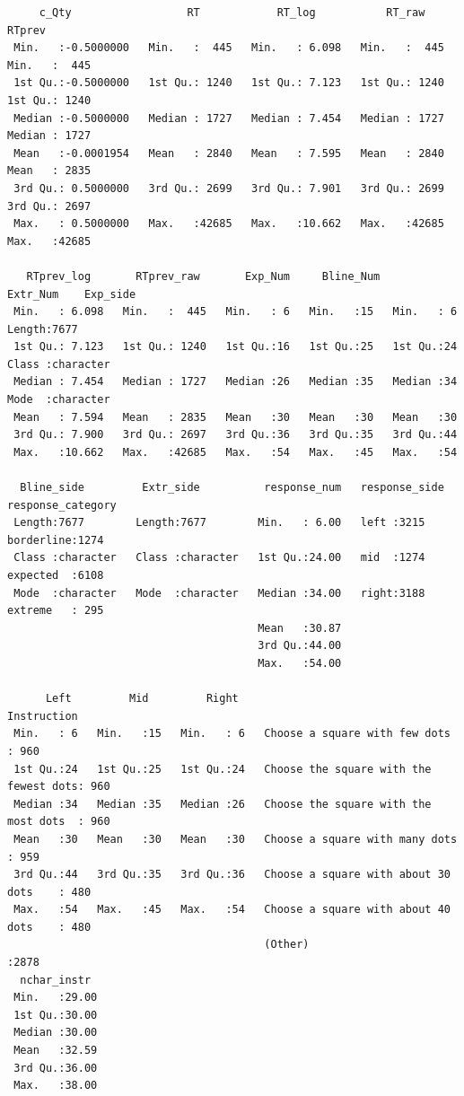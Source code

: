 \documentclass[a4paper,12pt,twoside]{article}\usepackage[]{graphicx}\usepackage[]{color}
\makeatletter
\newenvironment{kframe}{%
 \def\at@end@of@kframe{}%
 \ifinner\ifhmode%
  \def\at@end@of@kframe{\end{minipage}}%
  \begin{minipage}{\columnwidth}%
 \fi\fi%
 \def\FrameCommand##1{\hskip\@totalleftmargin \hskip-\fboxsep
 \colorbox{shadecolor}{##1}\hskip-\fboxsep
     \hskip-\linewidth \hskip-\@totalleftmargin \hskip\columnwidth}%
 \MakeFramed {\advance\hsize-\width
   \@totalleftmargin\z@ \linewidth\hsize
   \@setminipage}}%
 {\par\unskip\endMakeFramed%
 \at@end@of@kframe}
\newenvironment{knitrout}{}{} %
\makeatother
\begin{document}
\begin{knitrout}
\begin{kframe}
\begin{verbatim}
     c_Qty                  RT            RT_log           RT_raw          RTprev     
 Min.   :-0.5000000   Min.   :  445   Min.   : 6.098   Min.   :  445   Min.   :  445  
 1st Qu.:-0.5000000   1st Qu.: 1240   1st Qu.: 7.123   1st Qu.: 1240   1st Qu.: 1240  
 Median :-0.5000000   Median : 1727   Median : 7.454   Median : 1727   Median : 1727  
 Mean   :-0.0001954   Mean   : 2840   Mean   : 7.595   Mean   : 2840   Mean   : 2835  
 3rd Qu.: 0.5000000   3rd Qu.: 2699   3rd Qu.: 7.901   3rd Qu.: 2699   3rd Qu.: 2697  
 Max.   : 0.5000000   Max.   :42685   Max.   :10.662   Max.   :42685   Max.   :42685  
                                                                                      
   RTprev_log       RTprev_raw       Exp_Num     Bline_Num     Extr_Num    Exp_side        
 Min.   : 6.098   Min.   :  445   Min.   : 6   Min.   :15   Min.   : 6   Length:7677       
 1st Qu.: 7.123   1st Qu.: 1240   1st Qu.:16   1st Qu.:25   1st Qu.:24   Class :character  
 Median : 7.454   Median : 1727   Median :26   Median :35   Median :34   Mode  :character  
 Mean   : 7.594   Mean   : 2835   Mean   :30   Mean   :30   Mean   :30                     
 3rd Qu.: 7.900   3rd Qu.: 2697   3rd Qu.:36   3rd Qu.:35   3rd Qu.:44                     
 Max.   :10.662   Max.   :42685   Max.   :54   Max.   :45   Max.   :54                     
                                                                                           
  Bline_side         Extr_side          response_num   response_side  response_category
 Length:7677        Length:7677        Min.   : 6.00   left :3215    borderline:1274   
 Class :character   Class :character   1st Qu.:24.00   mid  :1274    expected  :6108   
 Mode  :character   Mode  :character   Median :34.00   right:3188    extreme   : 295   
                                       Mean   :30.87                                   
                                       3rd Qu.:44.00                                   
                                       Max.   :54.00                                   
                                                                                       
      Left         Mid         Right                                    Instruction  
 Min.   : 6   Min.   :15   Min.   : 6   Choose a square with few dots         : 960  
 1st Qu.:24   1st Qu.:25   1st Qu.:24   Choose the square with the fewest dots: 960  
 Median :34   Median :35   Median :26   Choose the square with the most dots  : 960  
 Mean   :30   Mean   :30   Mean   :30   Choose a square with many dots        : 959  
 3rd Qu.:44   3rd Qu.:35   3rd Qu.:36   Choose a square with about 30 dots    : 480  
 Max.   :54   Max.   :45   Max.   :54   Choose a square with about 40 dots    : 480  
                                        (Other)                               :2878  
  nchar_instr   
 Min.   :29.00  
 1st Qu.:30.00  
 Median :30.00  
 Mean   :32.59  
 3rd Qu.:36.00  
 Max.   :38.00  
                
\end{verbatim}
\end{kframe}
\end{knitrout}
\end{document}
